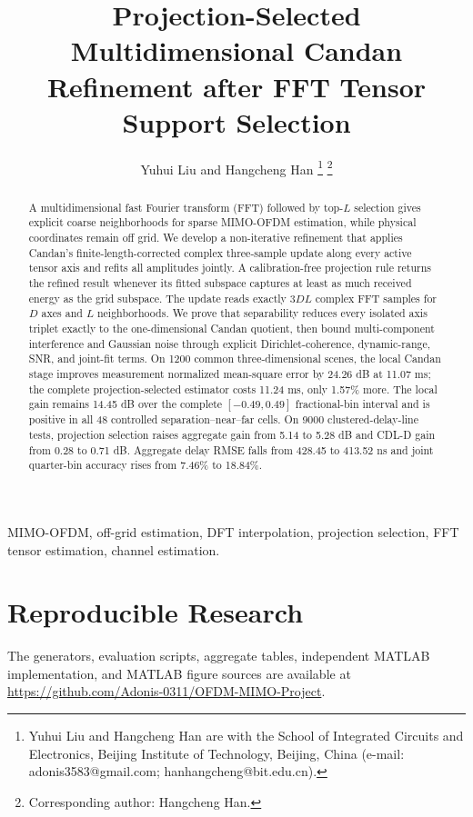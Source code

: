 \documentclass[journal]{IEEEtran}
\title{Projection-Selected Multidimensional Candan Refinement after FFT Tensor Support Selection}
\author{Yuhui Liu and Hangcheng Han%
\thanks{Yuhui Liu and Hangcheng Han are with the School of Integrated Circuits and Electronics, Beijing Institute of Technology, Beijing, China (e-mail: adonis3583@gmail.com; hanhangcheng@bit.edu.cn).}%
\thanks{Corresponding author: Hangcheng Han.}%
}
\begin{document}
\maketitle
{}

\begin{abstract}
A multidimensional fast Fourier transform (FFT) followed by top-$L$ selection gives explicit coarse neighborhoods for sparse MIMO-OFDM estimation, while physical coordinates remain off grid. We develop a non-iterative refinement that applies Candan's finite-length-corrected complex three-sample update along every active tensor axis and refits all amplitudes jointly. A calibration-free projection rule returns the refined result whenever its fitted subspace captures at least as much received energy as the grid subspace. The update reads exactly $3DL$ complex FFT samples for $D$ axes and $L$ neighborhoods. We prove that separability reduces every isolated axis triplet exactly to the one-dimensional Candan quotient, then bound multi-component interference and Gaussian noise through explicit Dirichlet-coherence, dynamic-range, SNR, and joint-fit terms. On 1200 common three-dimensional scenes, the local Candan stage improves measurement normalized mean-square error by 24.26 dB at 11.07 ms; the complete projection-selected estimator costs 11.24 ms, only 1.57\% more. The local gain remains 14.45 dB over the complete $[-0.49,0.49]$ fractional-bin interval and is positive in all 48 controlled separation--near--far cells. On 9000 clustered-delay-line tests, projection selection raises aggregate gain from 5.14 to 5.28 dB and CDL-D gain from 0.28 to 0.71 dB. Aggregate delay RMSE falls from 428.45 to 413.52 ns and joint quarter-bin accuracy rises from 7.46\% to 18.84\%.
\end{abstract}

\begin{IEEEkeywords}
MIMO-OFDM, off-grid estimation, DFT interpolation, projection selection, FFT tensor estimation, channel estimation.
\end{IEEEkeywords}










\section*{Reproducible Research}
The generators, evaluation scripts, aggregate tables, independent MATLAB implementation, and MATLAB figure sources are available at \url{https://github.com/Adonis-0311/OFDM-MIMO-Project}.
\end{document}
